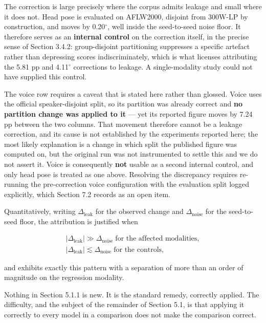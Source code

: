 The correction is large precisely where the corpus admits leakage and small where it does not. Head pose is evaluated on AFLW2000, disjoint from 300W-LP by construction, and moves by 0.20$^{\circ}$, well inside the seed-to-seed noise floor. It therefore serves as an \textbf{internal control} on the correction itself, in the precise sense of Section 3.4.2: group-disjoint partitioning suppresses a specific artefact rather than depressing scores indiscriminately, which is what licenses attributing the 5.81 pp and 4.11$^{\circ}$ corrections to leakage. A single-modality study could not have supplied this control.

The voice row requires a caveat that is stated here rather than glossed. Voice uses the official speaker-disjoint split, so its partition was already correct and \textbf{no partition change was applied to it} --- yet its reported figure moves by 7.24 pp between the two columns. That movement therefore cannot be a leakage correction, and its cause is not established by the experiments reported here; the most likely explanation is a change in which split the published figure was computed on, but the original run was not instrumented to settle this and we do not assert it. Voice is consequently \textbf{not} usable as a second internal control, and only head pose is treated as one above. Resolving the discrepancy requires re-running the pre-correction voice configuration with the evaluation split logged explicitly, which Section 7.2 records as an open item.

Quantitatively, writing $\Delta_{\mathrm{leak}}$ for the observed change and $\Delta_{\mathrm{noise}}$ for the seed-to-seed floor, the attribution is justified when

\begin{equation}
\label{eq:168}
\begin{aligned}
| \Delta _{\mathrm{leak}} | \gg \Delta _{\mathrm{noise}} \;\text{for the affected modalities}, \\
| \Delta _{\mathrm{leak}} | \lesssim \Delta _{\mathrm{noise}} \;\text{for the controls},
\end{aligned}
\end{equation}

and  exhibits exactly this pattern with a separation of more than an order of magnitude on the regression modality.

Nothing in Section 5.1.1 is new. It is the standard remedy, correctly applied. The difficulty, and the subject of the remainder of Section 5.1, is that applying it correctly to every model in a comparison does not make the comparison correct.

